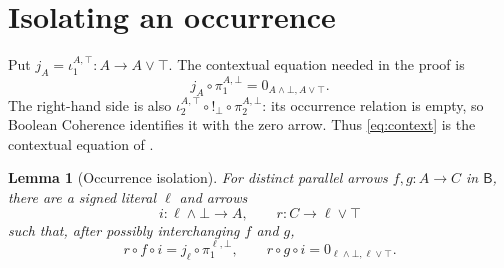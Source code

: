\documentclass[11pt]{article}
\newtheorem{lemma}[theorem]{Lemma}
\newcommand{\B}{\mathsf B}
\begin{document}
\section{Isolating an occurrence}\label{sec:isolation}

Put $j_A=\iota_1^{A,\top}:A\to A\vee\top$. The contextual equation
needed in the proof is
\begin{equation}
 j_A\circ\pi_1^{A,\bot}
   =0_{A\wedge\bot,A\vee\top}.
 \tag{$K_A$}\label{eq:context}
\end{equation}
The right-hand side is also
$\iota_2^{A,\top}\circ!_\bot\circ\pi_2^{A,\bot}$: its occurrence
relation is empty, so Boolean Coherence identifies it with the zero
arrow. Thus \eqref{eq:context} is the contextual equation of
\cite[\S9.7, pp.~215--216]{DP}.

\begin{lemma}[Occurrence isolation]\label{lem:isolation}
For distinct parallel arrows $f,g:A\to C$ in $\B$, there are a
signed literal $\ell$ and arrows
\[
 i:\ell\wedge\bot\longrightarrow A,
 \qquad r:C\longrightarrow\ell\vee\top
\]
such that, after possibly interchanging $f$ and $g$,
\[
 r\circ f\circ i=j_\ell\circ\pi_1^{\ell,\bot},
 \qquad
 r\circ g\circ i=0_{\ell\wedge\bot,\ell\vee\top}.
\]
\end{lemma}
\end{document}
